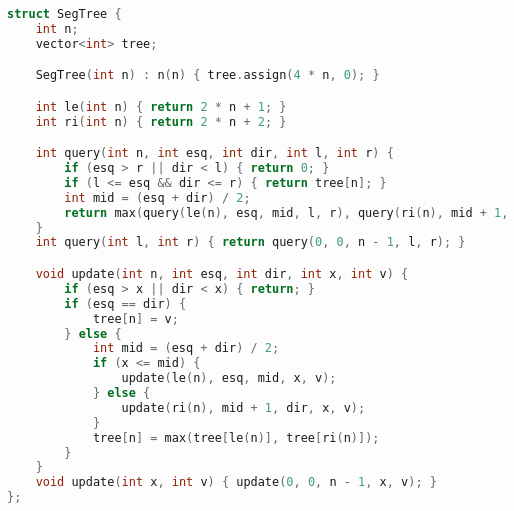 \documentclass[11pt, a4paper, twoside]{book}
\begin{document}
\begin{lstlisting}[language=C++]
struct SegTree {
    int n;
    vector<int> tree;

    SegTree(int n) : n(n) { tree.assign(4 * n, 0); }

    int le(int n) { return 2 * n + 1; }
    int ri(int n) { return 2 * n + 2; }

    int query(int n, int esq, int dir, int l, int r) {
        if (esq > r || dir < l) { return 0; }
        if (l <= esq && dir <= r) { return tree[n]; }
        int mid = (esq + dir) / 2;
        return max(query(le(n), esq, mid, l, r), query(ri(n), mid + 1, dir, l, r));
    }
    int query(int l, int r) { return query(0, 0, n - 1, l, r); }

    void update(int n, int esq, int dir, int x, int v) {
        if (esq > x || dir < x) { return; }
        if (esq == dir) {
            tree[n] = v;
        } else {
            int mid = (esq + dir) / 2;
            if (x <= mid) {
                update(le(n), esq, mid, x, v);
            } else {
                update(ri(n), mid + 1, dir, x, v);
            }
            tree[n] = max(tree[le(n)], tree[ri(n)]);
        }
    }
    void update(int x, int v) { update(0, 0, n - 1, x, v); }
};
\end{lstlisting}

\hfill
\end{document}
